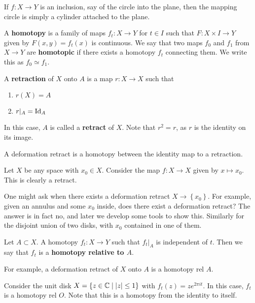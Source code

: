 \documentclass{../mathnotes}
\begin{document}
\begin{exmp}
    If $f:X\to Y$ is an inclusion, say of the circle into the plane, then the mapping circle is
    simply a cylinder attached to the plane.
\end{exmp}

\begin{defn}
    A \textbf{homotopy} is a family of maps $f_t:X\to Y$ for $t\in I$ such that $F:X\times I\to Y$ given by $F(x,y)=f_t(x)$ is continuous.
    We say that two maps $f_0$ and $f_1$ from $X\to Y$ are \textbf{homotopic} if there exists a homotopy $f_t$ connecting them. We write
    this as $f_0\simeq f_1$.
\end{defn}

\begin{defn}
    A \textbf{retraction} of $X$ onto $A$ is a map $r:X\to X$ such that
    \begin{enumerate}
        \item $r(X)=A$
        \item $r|_A=\operatorname{Id}_A$
    \end{enumerate}
    In this case, $A$ is called a \textbf{retract} of $X$. Note that $r^2=r$, as $r$ is the identity on its image.
\end{defn}

\begin{exmp}
    A deformation retract is a homotopy between the identity map to a retraction.
\end{exmp}

\begin{exmp}
    Let $X$ be any space with $x_0\in X$. Consider the map $f:X\to X$ given by $x\mapsto x_0$. This is clearly a retract.
\end{exmp}

One might ask when there exists a deformation retract $X\to \left\{ x_0 \right\}$. For example, given an annulus and some $x_0$
inside, does there exist a deformation retract? The answer is in fact no, and later we develop some tools to show this. Similarly
for the disjoint union of two disks, with $x_0$ contained in one of them.

\begin{defn}
    Let $A\subset X$. A homotopy $f_t:X\to Y$ such that $f_t|_A$ is independent of $t$. Then we say that $f_t$ is a \textbf{homotopy relative to $A$}.
\end{defn}

\begin{exmp}
    For example, a deformation retract of $X$ onto $A$ is a homotopy rel $A$.
\end{exmp}
\begin{exmp}
    Consider the unit disk $X=\left\{ z\in\mathbb{C}\mid |z|\leq 1 \right\}$ with $f_t(z)=ze^{2\pi it}$. In this case, $f_t$ is
    a homotopy rel $O$. Note that this is a homotopy from the identity to itself.
\end{exmp}
\end{document}

